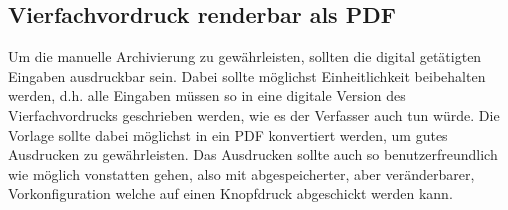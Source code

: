 \subsection{Vierfachvordruck renderbar als PDF}
Um die manuelle Archivierung zu gewährleisten, sollten die digital getätigten Eingaben ausdruckbar sein. Dabei sollte möglichst Einheitlichkeit beibehalten werden, d.h. alle Eingaben müssen so in eine digitale Version des Vierfachvordrucks geschrieben werden, wie es der Verfasser auch tun würde. Die Vorlage sollte dabei möglichst in ein PDF konvertiert werden, um gutes Ausdrucken zu gewährleisten. Das Ausdrucken sollte auch so benutzerfreundlich wie möglich vonstatten gehen, also mit abgespeicherter, aber veränderbarer, Vorkonfiguration welche auf einen Knopfdruck abgeschickt werden kann.